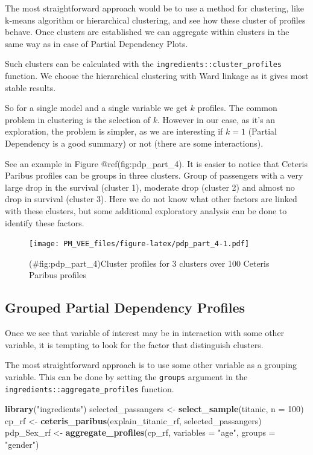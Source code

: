 \documentclass[12pt,]{krantz}
\newenvironment{Shaded}{\begin{snugshade}}{\end{snugshade}}
\newcommand{\DataTypeTok}[1]{\textcolor[rgb]{0.13,0.29,0.53}{#1}}
\newcommand{\DecValTok}[1]{\textcolor[rgb]{0.00,0.00,0.81}{#1}}
\newcommand{\KeywordTok}[1]{\textcolor[rgb]{0.13,0.29,0.53}{\textbf{#1}}}
\newcommand{\NormalTok}[1]{#1}
\newcommand{\StringTok}[1]{\textcolor[rgb]{0.31,0.60,0.02}{#1}}
\begin{document}
The most straightforward approach would be to use a method for clustering, like k-means algorithm or hierarchical clustering, and see how these cluster of profiles behave. Once clusters are established we can aggregate within clusters in the same way as in case of Partial Dependency Plots.

Such clusters can be calculated with the \texttt{ingredients::cluster\_profiles} function. We choose the hierarchical clustering with Ward linkage as it gives most stable results.

So for a single model and a single variable we get \(k\) profiles. The common problem in clustering is the selection of \(k\). However in our case, as it's an exploration, the problem is simpler, as we are interesting if \(k=1\) (Partial Dependency is a good summary) or not (there are some interactions).

See an example in Figure @ref(fig:pdp\_part\_4). It is easier to notice that Ceteris Paribus profiles can be groups in three clusters. Group of passengers with a very large drop in the survival (cluster 1), moderate drop (cluster 2) and almost no drop in survival (cluster 3). Here we do not know what other factors are linked with these clusters, but some additional exploratory analysis can be done to identify these factors.

\begin{figure}
\centering
\texttt{[image: PM\_VEE\_files/figure-latex/pdp\_part\_4-1.pdf]}
\caption{(\#fig:pdp\_part\_4)Cluster profiles for 3 clusters over 100 Ceteris Paribus profiles}
\end{figure}

\hypertarget{grouped-partial-dependency-profiles}{%
\subsection{Grouped Partial Dependency Profiles}\label{grouped-partial-dependency-profiles}}

Once we see that variable of interest may be in interaction with some other variable, it is tempting to look for the factor that distinguish clusters.

The most straightforward approach is to use some other variable as a grouping variable. This can be done by setting the \texttt{groups} argument in the \texttt{ingredients::aggregate\_profiles} function.

\begin{Shaded}
\begin{Highlighting}[]
\KeywordTok{library}\NormalTok{(}\StringTok{"ingredients"}\NormalTok{)}
\NormalTok{selected_passangers <-}\StringTok{ }\KeywordTok{select_sample}\NormalTok{(titanic, }\DataTypeTok{n =} \DecValTok{100}\NormalTok{)}
\NormalTok{cp_rf <-}\StringTok{ }\KeywordTok{ceteris_paribus}\NormalTok{(explain_titanic_rf, selected_passangers)}
\NormalTok{pdp_Sex_rf <-}\StringTok{ }\KeywordTok{aggregate_profiles}\NormalTok{(cp_rf, }\DataTypeTok{variables =} \StringTok{"age"}\NormalTok{,}
                \DataTypeTok{groups =} \StringTok{"gender"}\NormalTok{)}
\end{Highlighting}
\end{Shaded}
\end{document}
